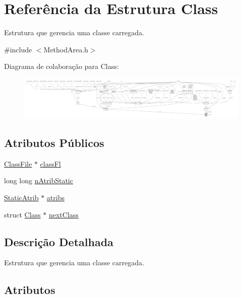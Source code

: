 \hypertarget{structClass}{}\section{Referência da Estrutura Class}
\label{structClass}


Estrutura que gerencia uma classe carregada.  




{\ttfamily \#include $<$Method\+Area.\+h$>$}



Diagrama de colaboração para Class\+:\nopagebreak
\begin{figure}[H]
\begin{center}
\leavevmode
\includegraphics[width=350pt]{structClass__coll__graph}
\end{center}
\end{figure}
\subsection*{Atributos Públicos}
\begin{DoxyCompactItemize}
\item 
\hyperlink{structClassFile}{Class\+File} $\ast$ \hyperlink{structClass_a13dbcdd95b80b2c8fbd266a656ca927a}{class\+Fl}
\item 
long long \hyperlink{structClass_a8af3ca1a9103400ec8118948464edad0}{n\+Atrib\+Static}
\item 
\hyperlink{structStaticAtrib}{Static\+Atrib} $\ast$ \hyperlink{structClass_a6cf0307cc3e514a4e8c6afb54f050da8}{atribs}
\item 
struct \hyperlink{structClass}{Class} $\ast$ \hyperlink{structClass_a79ceca419d487e69bc791a3c2e1a96f2}{next\+Class}
\end{DoxyCompactItemize}


\subsection{Descrição Detalhada}
Estrutura que gerencia uma classe carregada. 

\subsection{Atributos}
\mbox{\label{structClass_a6cf0307cc3e514a4e8c6afb54f050da8}} 
